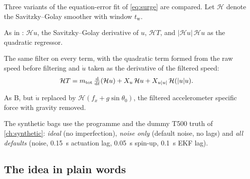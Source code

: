 Three variants of the equation-error fit of \eqref{eq:surge} are compared. Let $\mathcal{H}$
denote the Savitzky--Golay smoother with window $t_\mathrm{w}$.
\begin{description}[style=nextline]
  \item[A, current] As in : $\mathcal{H}u$, the Savitzky--Golay derivative of
        $u$, $\mathcal{H}T$, and $|\mathcal{H}u|\,\mathcal{H}u$ as the quadratic regressor.
  \item[B, consistent] The same filter on every term, with the quadratic term formed from the raw
        speed before filtering and $\dot u$ taken as the derivative of the filtered speed:
        \begin{equation}
          \mathcal{H}T = m_\mathrm{tot}\,\tfrac{\mathrm{d}}{\mathrm{d}t}(\mathcal{H}u)
            + X_u\,\mathcal{H}u + X_{u|u|}\,\mathcal{H}(|u|u).
          \label{eq:consistent}
        \end{equation}
  \item[C, IMU] As B, but $\dot u$ replaced by $\mathcal{H}(f_x + g\sin\theta_0)$, the filtered
        accelerometer specific force with gravity removed.
\end{description}
The synthetic bags use the  programme and the dummy T500 truth of
\cref{ch:synthetic}: \emph{ideal} (no imperfection), \emph{noise only} (default noise, no lags)
and \emph{all defaults} (noise, \qty{0.15}{\second} actuation lag, \qty{0.05}{\second} spin-up,
\qty{0.1}{\second} EKF lag).

\subsection{The idea in plain words}
\label{sec:plain-filter}

